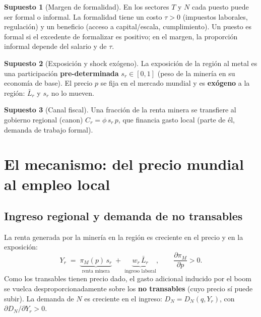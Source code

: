 \documentclass[11pt]{article}
\theoremstyle{definition}
\newtheorem{supuesto}{Supuesto}
\theoremstyle{plain}
\begin{document}
\begin{supuesto}[Margen de formalidad]\label{sup:formalidad}
En los sectores $T$ y $N$ cada puesto puede ser formal o informal. La formalidad tiene un costo
$\tau>0$ (impuestos laborales, regulación) y un beneficio (acceso a capital/escala,
cumplimiento). Un puesto es formal si el excedente de formalizar es positivo; en el margen, la
proporción informal depende del salario y de $\tau$.
\end{supuesto}

\begin{supuesto}[Exposición y shock exógeno]\label{sup:shock}
La exposición de la región al metal es una participación \textbf{pre-determinada} $s_r\in[0,1]$
(peso de la minería en su economía de base). El precio $p$ se fija en el mercado mundial y es
\textbf{exógeno} a la región: $\bar{L}_r$ y $s_r$ no lo mueven.
\end{supuesto}

\begin{supuesto}[Canal fiscal]\label{sup:canon}
Una fracción de la renta minera se transfiere al gobierno regional (canon) $C_r=\phi\, s_r\, p$,
que financia gasto local (parte de él, demanda de trabajo formal).
\end{supuesto}

\section{El mecanismo: del precio mundial al empleo local}

\subsection{Ingreso regional y demanda de no transables}
La renta generada por la minería en la región es creciente en el precio y en la exposición:
\begin{equation}
Y_r \;=\; \underbrace{\pi_M(p)\, s_r}_{\text{renta minera}}
\;+\; \underbrace{w_r\,\bar{L}_r}_{\text{ingreso laboral}},
\qquad \frac{\partial \pi_M}{\partial p}>0.
\end{equation}
Como los transables tienen precio dado, el gasto adicional inducido por el boom se vuelca
desproporcionadamente sobre los \textbf{no transables} (cuyo precio sí puede subir). La demanda
de $N$ es creciente en el ingreso: $D_N = D_N(q, Y_r)$, con $\partial D_N/\partial Y_r>0$.
\end{document}
